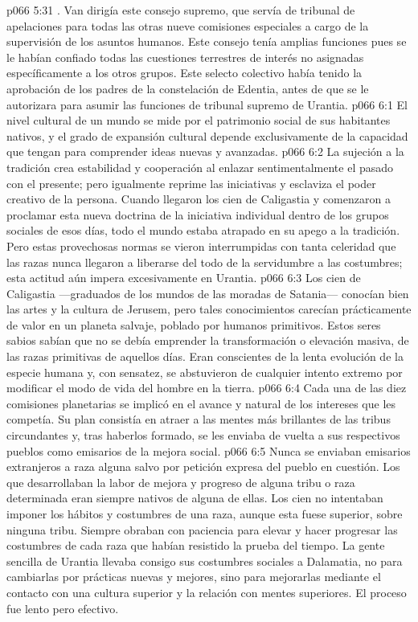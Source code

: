 \vs p066 5:31 . Van dirigía este consejo supremo, que servía de tribunal de apelaciones para todas las otras nueve comisiones especiales a cargo de la supervisión de los asuntos humanos. Este consejo tenía amplias funciones pues se le habían confiado todas las cuestiones terrestres de interés no asignadas específicamente a los otros grupos. Este selecto colectivo había tenido la aprobación de los padres de la constelación de Edentia, antes de que se le autorizara para asumir las funciones de tribunal supremo de Urantia.
\vs p066 6:1 El nivel cultural de un mundo se mide por el patrimonio social de sus habitantes nativos, y el grado de expansión cultural depende exclusivamente de la capacidad que tengan para comprender ideas nuevas y avanzadas.
\vs p066 6:2 La sujeción a la tradición crea estabilidad y cooperación al enlazar sentimentalmente el pasado con el presente; pero igualmente reprime las iniciativas y esclaviza el poder creativo de la persona. Cuando llegaron los cien de Caligastia y comenzaron a proclamar esta nueva doctrina de la iniciativa individual dentro de los grupos sociales de esos días, todo el mundo estaba atrapado en su apego a la tradición. Pero estas provechosas normas se vieron interrumpidas con tanta celeridad que las razas nunca llegaron a liberarse del todo de la servidumbre a las costumbres; esta actitud aún impera excesivamente en Urantia.
\vs p066 6:3 Los cien de Caligastia ---graduados de los mundos de las moradas de Satania--- conocían bien las artes y la cultura de Jerusem, pero tales conocimientos carecían prácticamente de valor en un planeta salvaje, poblado por humanos primitivos. Estos seres sabios sabían que no se debía emprender la transformación  o elevación masiva, de las razas primitivas de aquellos días. Eran conscientes de la lenta evolución de la especie humana y, con sensatez, se abstuvieron de cualquier intento extremo por modificar el modo de vida del hombre en la tierra.
\vs p066 6:4 Cada una de las diez comisiones planetarias se implicó en el avance  y natural de los intereses que les competía. Su plan consistía en atraer a las mentes más brillantes de las tribus circundantes y, tras haberlos formado, se les enviaba de vuelta a sus respectivos pueblos como emisarios de la mejora social.
\vs p066 6:5 Nunca se enviaban emisarios extranjeros a raza alguna salvo por petición expresa del pueblo en cuestión. Los que desarrollaban la labor de mejora y progreso de alguna tribu o raza determinada eran siempre nativos de alguna de ellas. Los cien no intentaban imponer los hábitos y costumbres de una raza, aunque esta fuese superior, sobre ninguna tribu. Siempre obraban con paciencia para elevar y hacer progresar las costumbres de cada raza que habían resistido la prueba del tiempo. La gente sencilla de Urantia llevaba consigo sus costumbres sociales a Dalamatia, no para cambiarlas por prácticas nuevas y mejores, sino para mejorarlas mediante el contacto con una cultura superior y la relación con mentes superiores. El proceso fue lento pero efectivo.
